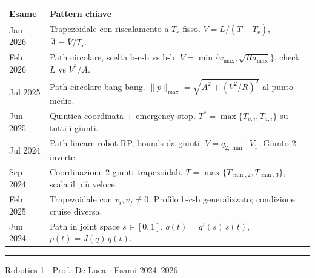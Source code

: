 \documentclass[10pt,a4paper]{article}
\begin{document}
\begin{center}
\renewcommand{\arraystretch}{1.4}
\begin{tabular}{@{}p{2.6cm}p{11.5cm}@{}}
\toprule
\textbf{Esame} & \textbf{Pattern chiave}\\
\midrule
Jan 2026 & Trapezoidale con riscalamento a $T_r$ fisso. $\bar{V} = L/(\bar{T}-T_r)$, $\bar{A} = \bar{V}/T_r$.\\
Feb 2026 & Path circolare, scelta b-c-b vs b-b. $V = \min\{v_{\max}, \sqrt{Ra_{\max}}\}$, check $L$ vs $V^2/A$.\\
Jul 2025 & Path circolare bang-bang. $\|\ddot{p}\|_{\max} = \sqrt{A^2 + (V^2/R)^2}$ al punto medio.\\
Jun 2025 & Quintica coordinata + emergency stop. $T^* = \max\{T_{v,i}, T_{a,i}\}$ su tutti i giunti.\\
Jul 2024 & Path lineare robot RP, bounds da giunti. $V = q_{2,\min}\cdot V_1$. Giunto 2 inverte.\\
Sep 2024 & Coordinazione 2 giunti trapezoidali. $T = \max\{T_{\min,2}, T_{\min,3}\}$, scala il pi\`u veloce.\\
Feb 2025 & Trapezoidale con $v_i, v_f \neq 0$. Profilo b-c-b generalizzato; condizione cruise diversa.\\
Jun 2024 & Path in joint space $s\in[0,1]$. $\dot{q}(t) = q'(s)\,\dot{s}(t)$, $\dot{p}(t) = J(q)\,\dot{q}(t)$.\\
\bottomrule
\end{tabular}
\end{center}

\vspace{6pt}
\hrule
\vspace{4pt}
{\centering\small Robotics 1 $\cdot$ Prof.\ De Luca $\cdot$ Esami 2024--2026\par}
\end{document}
